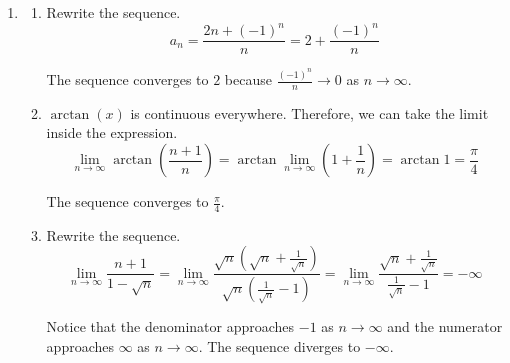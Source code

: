 \documentclass[a4paper, 12pt]{article}
\renewcommand{\headrulewidth}{0pt}
\renewcommand{\headrulewidth}{0pt}
\begin{document}
\begin{enumerate}[leftmargin=*,label=\textbf{\arabic*.}]
\item \begin{enumerate}[leftmargin=*,label=\textbf{\alph*.}]
\item Rewrite the sequence.
\[a_n=\frac{2n+(-1)^n}{n}=2+\frac{(-1)^n}n\]

The sequence converges to $\boxed2$ because $\displaystyle\frac{(-1)^n}n\to 0$ as $n\to\infty$.
\item $\arctan(x)$ is continuous everywhere. Therefore, we can take the limit inside the expression.
\[\lim_{n\to\infty}\arctan\left(\frac{n+1}n\right)=\arctan\lim_{n\to\infty}\left(1+\frac1n\right)=\arctan1=\frac\pi4\]

The sequence converges to $\displaystyle\boxed{\frac\pi4}$.
\item Rewrite the sequence.
\[\lim_{n\to\infty}\frac{n+1}{1-\sqrt n}=\lim_{n\to\infty}\frac{\sqrt n\left(\sqrt n+\frac1{\sqrt n}\right)}{\sqrt n\left(\frac1{\sqrt n}-1\right)}=\lim_{n\to\infty}\frac{\sqrt n+\frac1{\sqrt n}}{\frac1{\sqrt n}-1}=-\infty\]

Notice that the denominator approaches $-1$ as $n\to\infty$ and the numerator approaches $\infty$ as $n\to\infty$. The sequence diverges to $\boxed{-\infty}$.
\end{enumerate}
\end{enumerate}

\newpage
{}
{}

\newpage
\pagestyle{fancy}
\renewcommand{\headrulewidth}{1pt}

\end{document}
